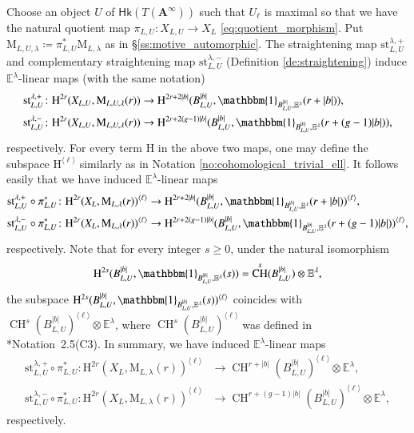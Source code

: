 \documentclass[12pt]{amsart}
\numberwithin{equation}{section}
\theoremstyle{plain}
\theoremstyle{definition}
\theoremstyle{remark}
\renewcommand{\b}[1]{\mathbf{#1}}
\renewcommand{\d}[1]{\mathbb{#1}}
\renewcommand{\r}[1]{\mathrm{#1}}
\renewcommand{\sf}[1]{\mathsf{#1}}
\renewcommand{\(}{\left(}
\renewcommand{\)}{\right)}
\newcommand{\ang}[1]{\langle{#1}\rangle}
\renewcommand{\geq}{\geqslant}
\newcommand{\bA}{\b A}
\newcommand{\dE}{\d E}
\newcommand{\rH}{\r H}
\newcommand{\rM}{\r M}
\newcommand{\st}{\r{st}}
\newcommand{\Hk}{\sf{Hk}}
\DeclareMathOperator{\CH}{CH}
\begin{document}
Choose an object $U$ of $\Hk(T(\bA^\infty))$ such that $U_\ell$ is maximal so that we have the natural quotient map $\pi_{L,U}\colon X_{L,U}\to X_L$ \eqref{eq:quotient_morphism}. Put $\rM_{L,U,\lambda}\coloneqq\pi_{L,U}^*\rM_{L,\lambda}$ as in \S\ref{ss:motive_automorphic}. The straightening map $\st_{L,U}^{\lambda,+}$ and complementary straightening map $\st_{L,U}^{\lambda,-}$ (Definition \ref{de:straightening}) induce $\dE^\lambda$-linear maps (with the same notation)
\begin{align*}
\st_{L,U}^{\lambda,+}\colon\rH^{2r}(X_{L,U},\rM_{L,U,\lambda}(r))
&\to\rH^{2r+2|b|}(B_{L,U}^{|b|},\mathbbm{1}_{B_{L,U}^{|b|},\dE^\lambda}(r+|b|)), \\
\st_{L,U}^{\lambda,-}\colon\rH^{2r}(X_{L,U},\rM_{L,U,\lambda}(r))
&\to\rH^{2r+2(g-1)|b|}(B_{L,U}^{|b|},\mathbbm{1}_{B_{L,U}^{|b|},\dE^\lambda}(r+(g-1)|b|)),
\end{align*}
respectively. For every term $\rH$ in the above two maps, one may define the subspace $\rH^{\ang\ell}$ similarly as in Notation \ref{no:cohomological_trivial_ell}. It follows easily that we have induced $\dE^\lambda$-linear maps
\begin{align*}
\st_{L,U}^{\lambda,+}\circ\pi_{L,U}^*\colon\rH^{2r}(X_L,\rM_{L,\lambda}(r))^{\ang\ell}
&\to\rH^{2r+2|b|}(B_{L,U}^{|b|},\mathbbm{1}_{B_{L,U}^{|b|},\dE^\lambda}(r+|b|))^{\ang\ell}, \\
\st_{L,U}^{\lambda,-}\circ\pi_{L,U}^*\colon\rH^{2r}(X_L,\rM_{L,\lambda}(r))^{\ang\ell}
&\to\rH^{2r+2(g-1)|b|}(B_{L,U}^{|b|},\mathbbm{1}_{B_{L,U}^{|b|},\dE^\lambda}(r+(g-1)|b|))^{\ang\ell},
\end{align*}
respectively. Note that for every integer $s\geq 0$, under the natural isomorphism
\[
\rH^{2s}(B_{L,U}^{|b|},\mathbbm{1}_{B_{L,U}^{|b|},\dE^\lambda}(s))=\CH^s(B_{L,U}^{|b|})\otimes\dE^\lambda,
\]
the subspace $\rH^{2s}(B_{L,U}^{|b|},\mathbbm{1}_{B_{L,U}^{|b|},\dE^\lambda}(s))^{\ang\ell}$ coincides with $\CH^s(B_{L,U}^{|b|})^{\ang\ell}\otimes\dE^\lambda$, where $\CH^s(B_{L,U}^{|b|})^{\ang\ell}$ was defined in \cite{LL21}*{Notation~2.5(C3)}. In summary, we have induced $\dE^\lambda$-linear maps
\begin{align*}
\st_{L,U}^{\lambda,+}\circ\pi_{L,U}^*\colon\rH^{2r}(X_L,\rM_{L,\lambda}(r))^{\ang\ell}
&\to\CH^{r+|b|}(B_{L,U}^{|b|})^{\ang\ell}\otimes\dE^\lambda, \\
\st_{L,U}^{\lambda,-}\circ\pi_{L,U}^*\colon\rH^{2r}(X_L,\rM_{L,\lambda}(r))^{\ang\ell}
&\to\CH^{r+(g-1)|b|}(B_{L,U}^{|b|})^{\ang\ell}\otimes\dE^\lambda,
\end{align*}
respectively.
\end{document}
